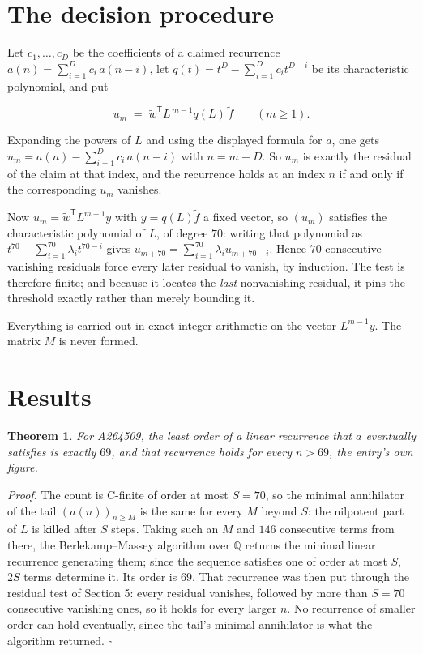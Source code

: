 \documentclass[11pt]{article}
\newtheorem{theorem}{Theorem}
\theoremstyle{definition}
\begin{document}
\section{The decision procedure}

Let $c_1,\dots,c_D$ be the coefficients of a claimed recurrence $a(n) = \sum_{i=1}^{D} c_i\,a(n-i)$, let $q(t) = t^{D} - \sum_{i=1}^{D} c_i t^{D-i}$ be its characteristic polynomial, and put

\[u_m \;=\; \tilde w^{\mathsf T} L^{\,m-1} q(L)\,\tilde f \qquad (m \ge 1).\]

Expanding the powers of $L$ and using the displayed formula for $a$, one gets $u_m = a(n) - \sum_{i=1}^{D} c_i\,a(n-i)$ with $n = m + D$. So $u_m$ is exactly the residual of the claim at that index, and the recurrence holds at an index $n$ if and only if the corresponding $u_m$ vanishes.

Now $u_m = \tilde w^{\mathsf T} L^{m-1} y$ with $y = q(L)\tilde f$ a fixed vector, so $(u_m)$ satisfies the characteristic polynomial of $L$, of degree $70$: writing that polynomial as $t^{70} - \sum_{i=1}^{70} \lambda_i t^{70-i}$ gives $u_{m+70} = \sum_{i=1}^{70} \lambda_i u_{m+70-i}$. Hence $70$ consecutive vanishing residuals force every later residual to vanish, by induction. The test is therefore finite; and because it locates the {\itshape last} nonvanishing residual, it pins the threshold exactly rather than merely bounding it.

Everything is carried out in exact integer arithmetic on the vector $L^{m-1}y$. The matrix $M$ is never formed.

\section{Results}

\begin{theorem} For A264509, the least order of a linear recurrence that $a$ eventually satisfies is exactly $69$, and that recurrence holds for every $n > 69$, the entry's own figure.\end{theorem}

{\itshape Proof.} The count is C-finite of order at most $S = 70$, so the minimal annihilator of the tail $(a(n))_{n \ge M}$ is the same for every $M$ beyond $S$: the nilpotent part of $L$ is killed after $S$ steps. Taking such an $M$ and $146$ consecutive terms from there, the Berlekamp--Massey algorithm over $\mathbb{Q}$ returns the minimal linear recurrence generating them; since the sequence satisfies one of order at most $S$, $2S$ terms determine it. Its order is $69$. That recurrence was then put through the residual test of Section 5: every residual vanishes, followed by more than $S = 70$ consecutive vanishing ones, so it holds for every larger $n$. No recurrence of smaller order can hold eventually, since the tail's minimal annihilator is what the algorithm returned. $\square$
\end{document}

